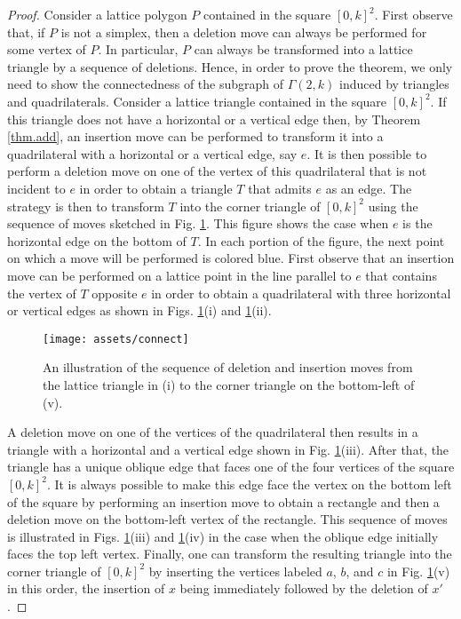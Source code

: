 \documentclass[a4paper]{article}
\begin{document}
\begin{proof}
Consider a lattice polygon $P$ contained in the square $[0,k]^2$. First observe that, if $P$ is not a simplex, then a deletion move can always be performed for some vertex of $P$. In particular, $P$ can always be transformed into a lattice triangle by a sequence of deletions. Hence, in order to prove the theorem, we only need to show the connectedness of the subgraph of $\Gamma(2,k)$ induced by triangles and quadrilaterals. Consider a lattice triangle contained in the square $[0,k]^2$. If this triangle does not have a horizontal or a vertical edge then, by Theorem \ref{thm.add}, an insertion move can be performed to transform it into a quadrilateral with a horizontal or a vertical edge, say $e$. It is then possible to perform a deletion move on one of the vertex of  this quadrilateral that is not incident to $e$ in order to obtain a triangle $T$ that admits $e$ as an edge. The strategy is then to transform $T$ into the corner triangle of $[0,k]^2$ using the sequence of moves sketched in Fig. \ref{fig:connect}. This figure shows the case when $e$ is the horizontal edge on the bottom of $T$. In each portion of the figure, the next point on which a move will be performed is colored blue. First observe that an insertion move can be performed on a lattice point in the line parallel to $e$ that contains the vertex of $T$ opposite $e$ in order to obtain a quadrilateral with three horizontal or vertical edges as shown in Figs. \ref{fig:connect}(i) and \ref{fig:connect}(ii).
\begin{figure}[b]
\begin{center}
\texttt{[image: assets/connect]}
\caption{An illustration of the sequence of deletion and insertion moves from the lattice triangle in (i) to the corner triangle on the bottom-left of (v).}
\label{fig:connect}
\end{center}
\end{figure}
A deletion move on one of the vertices of the quadrilateral then results in a triangle with a horizontal and a vertical edge shown in Fig. \ref{fig:connect}(iii). After that, the triangle has a unique oblique edge that faces one of the four vertices of the square $[0,k]^2$. It is always possible to make this edge face the vertex on the bottom left of the square by performing an insertion move to obtain a rectangle and then a deletion move on the bottom-left vertex of the rectangle. This sequence of moves is illustrated in Figs. \ref{fig:connect}(iii) and \ref{fig:connect}(iv) in the case when the oblique edge initially faces the top left vertex. Finally, one can transform the resulting triangle into the corner triangle of $[0,k]^2$ by inserting the vertices labeled $a$, $b$, and $c$ in Fig. \ref{fig:connect}(v) in this order, the insertion of $x$ being immediately followed by the deletion of $x'$.
\end{proof}
\end{document}
